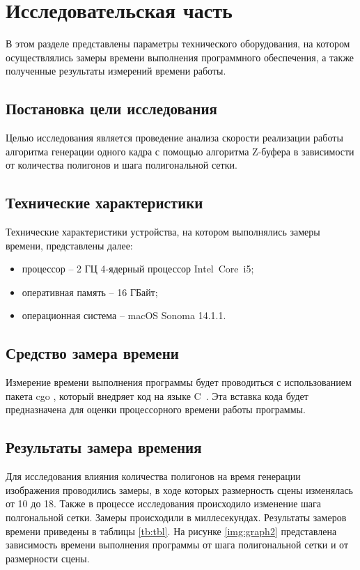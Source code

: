 \chapter{Исследовательская часть}

В этом разделе представлены параметры технического оборудования, на 
котором осуществлялись замеры времени выполнения программного обеспечения, 
а также полученные результаты измерений времени работы.

\section{Постановка цели исследования}

Целью исследования является проведение анализа скорости реализации работы алгоритма генерации одного кадра с помощью алгоритма Z-буфера в 
зависимости от количества полигонов и шага полигональной сетки.

\section{Технические характеристики}

Технические характеристики устройства, на котором выполнялись замеры времени, представлены далее:

\begin{itemize}
	\item процессор -- 2 ГЦ 4‑ядерный процессор Intel Core i5;
	\item оперативная память -- 16 ГБайт;
	\item операционная система -- macOS Sonoma 14.1.1. 
\end{itemize}

\section{Средство замера времени}

Измерение времени выполнения программы будет проводиться с использованием пакета cgo \cite{cgo}, который внедряет код на языке C~\cite{c}. 
Эта вставка кода будет предназначена для оценки процессорного времени работы программы.

\section{Результаты замера времения}

Для исследования влияния количества полигонов на время генерации изображения проводились замеры, 
в ходе которых размерность сцены изменялась от 10 до 18. Также в процессе исследования происходило изменение шага 
полгональной сетки. Замеры происходили в миллесекундах. Результаты замеров времени приведены в 
таблицы \ref{tb:tbl}. На рисунке \ref{img:graph2} представлена зависимость 
времени выполнения программы от шага полигональной сетки и от размерности сцены.

